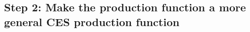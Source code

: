 \documentclass[letterpaper,12pt]{article}
\theoremstyle{definition}
\begin{document}
\begin{spacing}{1.5}
%
%
%


\section*{Step 2: Make the production function a more general CES production function}


\end{spacing}
\end{document}
